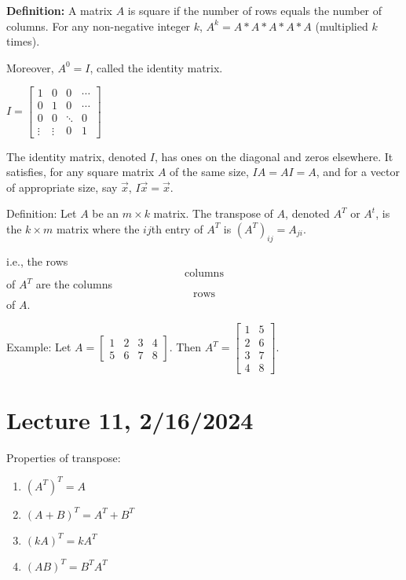 \documentclass{article}
\begin{document}
\textbf{Definition:} A matrix $A$ is square if the number of rows equals the number of columns. For any non-negative integer $k$, $A^k = A * A * A * A * A$ (multiplied $k$ times).

Moreover, $A^0 = I$, called the identity matrix. 

$I = \begin{bmatrix} 1 & 0 & 0 & \cdots \\ 0 & 1 & 0 & \cdots \\ 0 & 0 & \ddots & 0 \\ \vdots & \vdots & 0 & 1 \end{bmatrix}$


The identity matrix, denoted \( I \), has ones on the diagonal and zeros elsewhere. It satisfies, for any square matrix \( A \) of the same size, \( IA = AI = A \), and for a vector of appropriate size, say \( \vec{x} \), \( I\vec{x} = \vec{x} \).


Definition: Let \( A \) be an \( m \times k \) matrix. The transpose of \( A \), denoted \( A^T \) or \( A^t \), is the \( k \times m \) matrix where the \( ij \)th entry of \( A^T \) is \( (A^T)_{ij} = A_{ji} \).

i.e., the rows \[ \text{columns} \] of \( A^T \) are the columns \[ \text{rows} \] of \( A \).


Example: Let \( A = \begin{bmatrix} 1 & 2 & 3 & 4 \\ 5 & 6 & 7 & 8 \end{bmatrix} \). Then \( A^T = \begin{bmatrix} 1 & 5 \\ 2 & 6 \\ 3 & 7 \\ 4 & 8 \end{bmatrix} \).


\section{Lecture 11, 2/16/2024}

Properties of transpose:

\begin{enumerate}
    \item \( (A^T)^T = A \)
    \item \( (A + B)^T = A^T + B^T \)
    \item \( (kA)^T = kA^T \)
    \item \( (AB)^T = B^TA^T \)
\end{enumerate}
\end{document}
